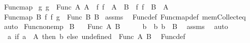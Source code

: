\begin{isabellebody}
\isanewline
{}\isamarkupfalse%
\ Func{\isacharunderscore}{\kern0pt}map{\isacharcolon}{\kern0pt}\isanewline
{}\ g{\isacharcolon}{\kern0pt}\ {\isachardoublequoteopen}g\ {\isasymin}\ Func\ A{}\ A{}{\isachardoublequoteclose}\ \ f{}{\isacharcolon}{\kern0pt}\ {\isachardoublequoteopen}f{}\ {\isacharbackquote}{\kern0pt}\ A{}\ {\isasymsubseteq}\ B{}{\isachardoublequoteclose}\ \ f{}{\isacharcolon}{\kern0pt}\ {\isachardoublequoteopen}f{}\ {\isacharbackquote}{\kern0pt}\ B{}\ {\isasymsubseteq}\ A{}{\isachardoublequoteclose}\isanewline
{}\ {\isachardoublequoteopen}Func{\isacharunderscore}{\kern0pt}map\ B{}\ f{}\ f{}\ g\ {\isasymin}\ Func\ B{}\ B{}{\isachardoublequoteclose}\isanewline
%
\isadelimproof
%
\endisadelimproof
%
\isatagproof
{}\isamarkupfalse%
\ assms\ \isamarkupfalse%
\ Func{\isacharunderscore}{\kern0pt}def\ Func{\isacharunderscore}{\kern0pt}map{\isacharunderscore}{\kern0pt}def\ mem{\isacharunderscore}{\kern0pt}Collect{\isacharunderscore}{\kern0pt}eq\ \isamarkupfalse%
\ auto%
\endisatagproof
{\isafoldproof}%
%
\isadelimproof
\isanewline
%
\endisadelimproof
\isanewline
{}\isamarkupfalse%
\ Func{\isacharunderscore}{\kern0pt}non{\isacharunderscore}{\kern0pt}emp{\isacharcolon}{\kern0pt}\isanewline
{}\ {\isachardoublequoteopen}B\ {\isasymnoteq}\ {\isacharbraceleft}{\kern0pt}{\isacharbraceright}{\kern0pt}{\isachardoublequoteclose}\isanewline
{}\ {\isachardoublequoteopen}Func\ A\ B\ {\isasymnoteq}\ {\isacharbraceleft}{\kern0pt}{\isacharbraceright}{\kern0pt}{\isachardoublequoteclose}\isanewline
%
\isadelimproof
%
\endisadelimproof
%
\isatagproof
{}\isamarkupfalse%
{\isacharminus}{\kern0pt}\isanewline
\ \ \isamarkupfalse%
\ b\ \ b{\isacharcolon}{\kern0pt}\ {\isachardoublequoteopen}b\ {\isasymin}\ B{\isachardoublequoteclose}\ \isamarkupfalse%
\ assms\ \isamarkupfalse%
\ auto\isanewline
\ \ \isamarkupfalse%
\ {\isachardoublequoteopen}{\isacharparenleft}{\kern0pt}{\isasymlambda}\ a{\isachardot}{\kern0pt}\ if\ a\ {\isasymin}\ A\ then\ b\ else\ undefined{\isacharparenright}{\kern0pt}\ {\isasymin}\ Func\ A\ B{\isachardoublequoteclose}\ \isamarkupfalse%
\ Func{\isacharunderscore}{\kern0pt}def\ \isamarkupfalse%

\end{isabellebody}
